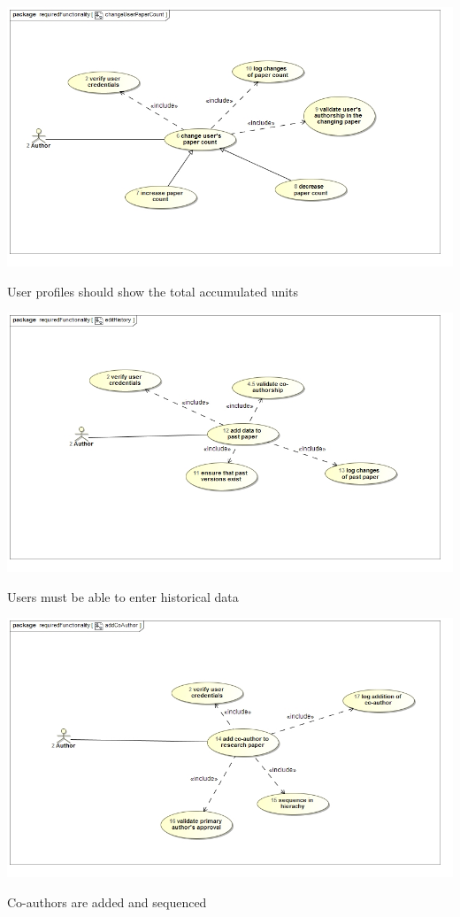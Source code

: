 \documentclass[a4paper,12pt]{report}
\begin{document}
\begin{flushleft}
	\includegraphics[scale=0.5]{./images/uc__changeUserPaperCount.jpg} 
	\begin{center}
		User profiles should show the total accumulated units
	\end{center}

	\includegraphics[scale=0.5]{./images/uc__editHistory.jpg}
	\begin{center}
		Users must be able to enter historical data
	\end{center}
\end{flushleft}

\newpage

\begin{flushleft}
	\includegraphics[scale=0.5]{./images/uc__addCoAuthor.jpg} 
	\begin{center}
		Co-authors are added and sequenced
	\end{center}
\end{flushleft}
\end{document}
